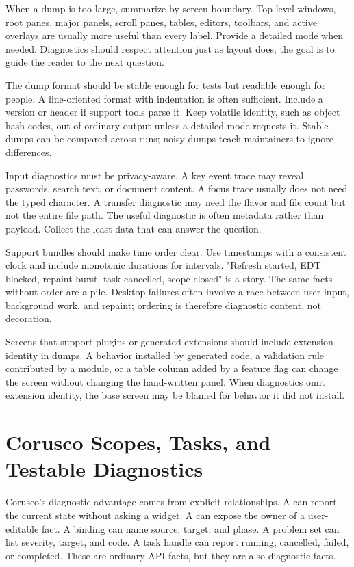 When a dump is too large, summarize by screen boundary. Top-level windows, root panes, major panels, scroll panes, tables, editors, toolbars, and active overlays are usually more useful than every label. Provide a detailed mode when needed. Diagnostics should respect attention just as layout does; the goal is to guide the reader to the next question.

The dump format should be stable enough for tests but readable enough for people. A line-oriented format with indentation is often sufficient. Include a version or header if support tools parse it. Keep volatile identity, such as object hash codes, out of ordinary output unless a detailed mode requests it. Stable dumps can be compared across runs; noisy dumps teach maintainers to ignore differences.

Input diagnostics must be privacy-aware. A key event trace may reveal passwords, search text, or document content. A focus trace usually does not need the typed character. A transfer diagnostic may need the flavor and file count but not the entire file path. The useful diagnostic is often metadata rather than payload. Collect the least data that can answer the question.

Support bundles should make time order clear. Use timestamps with a consistent clock and include monotonic durations for intervals. "Refresh started, EDT blocked, repaint burst, task cancelled, scope closed" is a story. The same facts without order are a pile. Desktop failures often involve a race between user input, background work, and repaint; ordering is therefore diagnostic content, not decoration.

Screens that support plugins or generated extensions should include extension identity in dumps. A behavior installed by generated code, a validation rule contributed by a module, or a table column added by a feature flag can change the screen without changing the hand-written panel. When diagnostics omit extension identity, the base screen may be blamed for behavior it did not install.

\section{Corusco Scopes, Tasks, and Testable Diagnostics}

Corusco's diagnostic advantage comes from explicit relationships. A  can report the current state without asking a widget. A  can expose the owner of a user-editable fact. A binding can name source, target, and phase. A problem set can list severity, target, and code. A task handle can report running, cancelled, failed, or completed. These are ordinary API facts, but they are also diagnostic facts.

